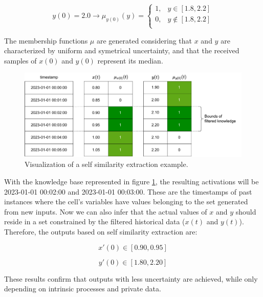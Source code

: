 \begin{equation}
    y(0) = 2.0 \rightarrow \mu_{y(0)}(y) =
    \begin{cases}
        1, & y \in [1.8, 2.2]    \\
        0, & y \notin [1.8, 2.2] \\
    \end{cases}
\end{equation}

The membership functions $\mu$ are generated considering that $x$ and $y$ are characterized by uniform and symetrical uncertainty, and that the received samples of $x(0)$ and $y(0)$ represent its median.

\begin{figure}[h!]
    \centering
    \includegraphics[width=\linewidth]{figures/chapter4/cell/solo_state_estimation.pdf}
    \caption{Visualization of a self similarity extraction example.}
    \label{fig:solo_state_estimation}
\end{figure}


With the knowledge base represented in figure \ref{fig:solo_state_estimation}, the resulting activations will be 2023-01-01 00:02:00 and 2023-01-01 00:03:00. These are the timestamps of past instances where the cell's variables have values belonging to the set generated from new inputs. Now we can also infer that the actual values of $x$ and $y$ should reside in a set constrained by the filtered historical data ($x(t)$ and $y(t)$). Therefore, the outputs based on self similarity extraction are:

\begin{equation}
    x'(0) \in [0.90, 0.95]
\end{equation}

\begin{equation}
    y'(0) \in [1.80, 2.20]
\end{equation}

These results confirm that outputs with less uncertainty are achieved, while only depending on intrinsic processes and private data.

